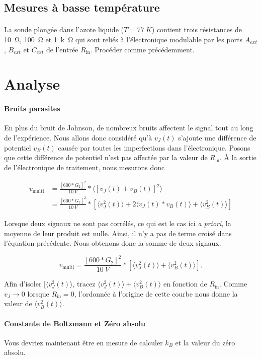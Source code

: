 \documentclass[12pt,oneside,letterpaper]{article}
\begin{document}
\subsection{Mesures à basse température}


\paragraph{}La sonde plongée dans l'azote liquide ($T=\SI{77}{K}$) contient trois résistances de \SI{10}{\ohm}, \SI{100}{\ohm} et \SI{1}{k\ohm} qui sont reliés à l'électronique modulable par les ports $A_{ext}$, $B_{ext}$ et $C_{ext}$ de l'entrée $R_{\mathrm{in}}$. Procéder comme précédemment.


\section*{Analyse}


\paragraph{Bruits parasites}En plus du bruit de Johnson, de nombreux bruits affectent le signal tout au long de l'expérience. Nous allons donc considéré qu'à $v_J\!\left(t\right)$ s'ajoute une différence de potentiel $v_B\!\left(t\right)$ causée par toutes les imperfections dans l'électronique. Posons que cette différence de potentiel n'est pas affectée par la valeur de $R_{\mathrm{in}}$. À la sortie de l'électronique de traitement, nous mesurons donc


\begin{align*}
v_{\mathrm{multi}} &= \frac{[600*G_2]^2}{\SI{10}{V}}*\langle[ v_{J}\!\left(t\right)+v_{B}\!\left(t\right) ]^2\rangle\\
&= \frac{[600*G_2]^2}{\SI{10}{V}} *[\langle v_{J}^2\!\left(t\right) \rangle+ 2\langle v_{J}\!\left(t\right) * v_{B}\!\left(t\right) \rangle+ \langle v_{B}^2\!\left(t\right) \rangle]
\end{align*}


Lorsque deux signaux ne sont pas corrélés, ce qui est le cas ici \emph{a priori}, la moyenne de leur produit est nulle. Ainsi, il n'y a pas de terme croisé dans l'équation précédente. Nous obtenons donc la somme de deux signaux.


\begin{equation*}
v_{\mathrm{multi}} = \frac{[600*G_2]^2}{\SI{10}{V}} *[\langle v_{J}^2\!\left(t\right) \rangle+ \langle v_{B}^2\!\left(t\right) \rangle].
\end{equation*}


Afin d'isoler $[\langle v_{J}^2\!\left(t\right) \rangle$, tracez $\langle v_{J}^2\!\left(t\right) \rangle+ \langle v_{B}^2\!\left(t\right) \rangle$ en fonction de $R_{\mathrm{in}}$. Comme $v_J\rightarrow0$ lorsque $R_{\mathrm{in}}=0$, l'ordonnée à l'origine de cette courbe nous donne la valeur de $\langle v_{B}^2\!\left(t\right) \rangle$.


\paragraph{Constante de Boltzmann et Zéro absolu}Vous devriez maintenant être en mesure de calculer $k_B$ et la valeur du zéro absolu.
\end{document}
